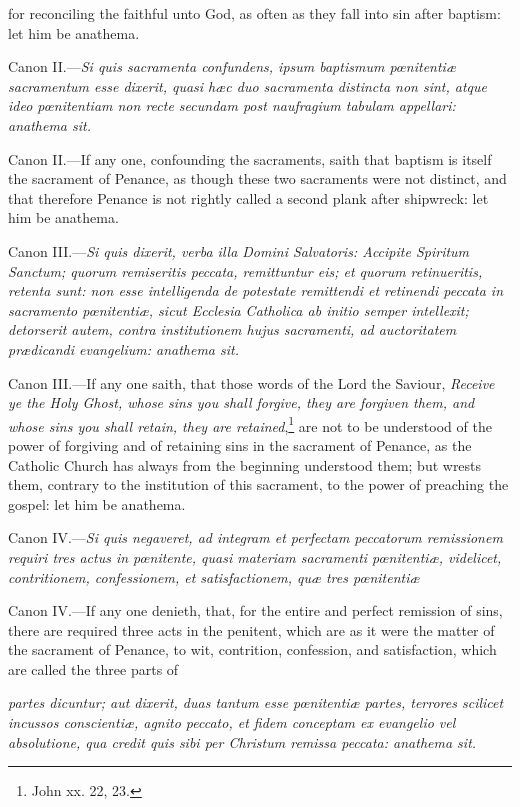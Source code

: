 for reconciling the faithful unto God, as often as they fall into sin after baptism: let him be anathema.

Canon II.—\emph{Si quis sacramenta confundens, ipsum baptismum pœnitentiæ sacramentum esse dixerit, quasi hæc duo sacramenta distincta non sint, atque ideo pœnitentiam non recte secundam post naufragium tabulam appellari: anathema sit.}

Canon II.—If any one, confounding the sacraments, saith that baptism is itself the sacrament of Penance, as though these two sacraments were not distinct, and that therefore Penance is not rightly called a second plank after shipwreck: let him be anathema.

Canon III.—\emph{Si quis dixerit, verba illa Domini Salvatoris: Accipite Spiritum Sanctum; quorum remiseritis peccata, remittuntur eis; et quorum retinueritis, retenta sunt: non esse intelligenda de potestate remittendi et retinendi peccata in sacramento pœnitentiæ, sicut Ecclesia Catholica ab initio semper intellexit; detorserit autem, contra institutionem hujus sacramenti, ad auctoritatem prædicandi evangelium: anathema sit.}

Canon III.—If any one saith, that those words of the Lord the Saviour, \emph{Receive ye the Holy Ghost, whose sins you shall forgive, they are forgiven them, and whose sins you shall retain, they are retained},\footnote{\par   John xx. 22, 23.} are not to be understood of the power of forgiving and of retaining sins in the sacrament of Penance, as the Catholic Church has always from the beginning understood them; but wrests them, contrary to the institution of this sacrament, to the power of preaching the gospel: let him be anathema.

Canon IV.—\emph{Si quis negaveret, ad integram et perfectam peccatorum remissionem requiri tres actus in pœnitente, quasi materiam sacramenti pœnitentiæ, videlicet, contritionem, confessionem, et satisfactionem, quæ tres pœnitentiæ}

Canon IV.—If any one denieth, that, for the entire and perfect remission of sins, there are required three acts in the penitent, which are as it were the matter of the sacrament of Penance, to wit, contrition, confession, and satisfaction, which are called the three parts of

\emph{partes dicuntur; aut dixerit, duas tantum esse pœnitentiæ partes, terrores scilicet incussos conscientiæ, agnito peccato, et fidem conceptam ex evangelio vel absolutione, qua credit quis sibi per Christum remissa peccata: anathema sit.}

